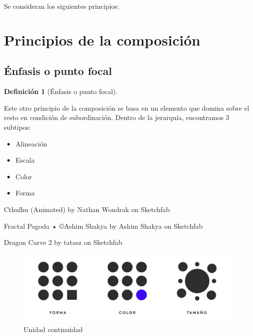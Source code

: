 \documentclass[
  16pt,
]{krantz}
\providecommand{\tightlist}{%
  \setlength{\itemsep}{0pt}\setlength{\parskip}{0pt}}
\theoremstyle{definition}
\newtheorem{definition}{Definición}[chapter]
\theoremstyle{definition}
\theoremstyle{definition}
\theoremstyle{definition}
\theoremstyle{remark}
\begin{document}
Se consideran los siguientes principios:

\hypertarget{principios-de-la-composiciuxf3n}{%
\section{Principios de la composición}\label{principios-de-la-composiciuxf3n}}

\hypertarget{uxe9nfasis-o-punto-focal}{%
\subsection{Énfasis o punto focal}\label{uxe9nfasis-o-punto-focal}}

\begin{definition}[Énfasis o punto focal]
\protect\hypertarget{def:ww}{}\label{def:ww}

Este otro principio de la composición se basa en un elemento que domina sobre el resto en condición de subordinación. Dentro de la jerarquía, encontramos 3 subtipos:

\begin{itemize}
\tightlist
\item
  Alineación
\item
  Escala
\item
  Color
\item
  Forma
\end{itemize}

\end{definition}

Cthulhu (Animated) by Nathan Wondrak on Sketchfab

Fractal Pagoda • ©Ashim Shakya by Ashim Shakya on Sketchfab

Dragon Curve 2 by tatasz on Sketchfab

\begin{figure}

{\centering \includegraphics[width=1\linewidth,height=1\textheight]{enfasis} 

}

\caption{Unidad continuidad}\label{fig:enfasisw}
\end{figure}
\end{document}
